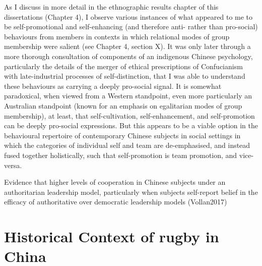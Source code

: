 {  As I discuss in more detail in the ethnographic results chapter of this dissertations (Chapter 4), I observe various instances of what appeared to me to be self-promotional and self-enhancing (and therefore anti- rather than pro-social) behaviours from members in contexts in which relational modes of group membership were salient (see Chapter 4, section X).  It was only later through a more thorough consultation of components of an indigenous Chinese psychology, particularly the details of the merger of ethical prescriptions of Confucianism with late-industrial processes of self-distinction, that I was able to understand these behaviours as carrying a deeply pro-social signal.  It is somewhat paradoxical, when viewed from a Western standpoint, even more particularly an Australian standpoint (known for an emphasis on egalitarian modes of group membership), at least, that self-cultivation, self-enhancement, and self-promotion can be deeply pro-social expressions.  But this appears to be a viable option in the behavioural repertoire of contemporary Chinese subjects in social settings in which the categories of individual self and team are de-emphasised, and instead fused together holistically, such that self-promotion is team promotion, and vice-versa.

  Evidence that higher levels of cooperation in Chinese subjects under an authoritarian leadership model, particularly when subjects self-report belief in the efficacy of authoritative over democratic leadership models (Vollan2017)














\section{Historical Context of rugby in China}

}
